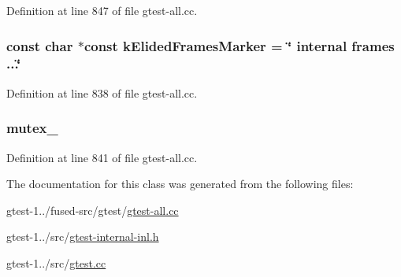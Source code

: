 \-Definition at line 847 of file gtest-\/all.\-cc.

\hypertarget{classtesting_1_1internal_1_1OsStackTraceGetter_adf15738d11421bb96e42bd0baa4ab1cd}{
\subsubsection[{k\-Elided\-Frames\-Marker}]{\setlength{\rightskip}{0pt plus 5cm}const char $\ast$const {\bf k\-Elided\-Frames\-Marker} = \char`\"{} internal frames ...\char`\"{}}}\label{df/de4/classtesting_1_1internal_1_1OsStackTraceGetter_adf15738d11421bb96e42bd0baa4ab1cd}


\-Definition at line 838 of file gtest-\/all.\-cc.

\hypertarget{classtesting_1_1internal_1_1OsStackTraceGetter_a01268d7e44c318a733a4c6c4d08deb04}{
\subsubsection[{mutex\-\_\-}]{ {\bf mutex\-\_\-}}}\label{df/de4/classtesting_1_1internal_1_1OsStackTraceGetter_a01268d7e44c318a733a4c6c4d08deb04}


\-Definition at line 841 of file gtest-\/all.\-cc.



\-The documentation for this class was generated from the following files\-:\begin{DoxyCompactItemize}
\item 
gtest-\/1../fused-\/src/gtest/\hyperlink{fused-src_2gtest_2gtest-all_8cc}{gtest-\/all.\-cc}\item 
gtest-\/1../src/\hyperlink{gtest-internal-inl_8h}{gtest-\/internal-\/inl.\-h}\item 
gtest-\/1../src/\hyperlink{gtest_8cc}{gtest.\-cc}\end{DoxyCompactItemize}
